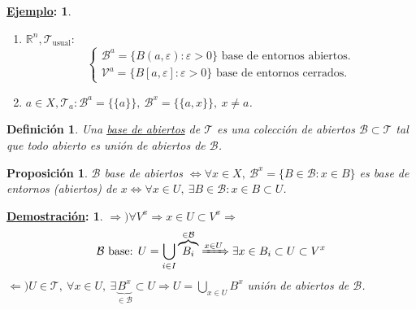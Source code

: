 \documentclass[10pt,a4paper,openright]{book}
\theoremstyle{break}
\newtheorem*{defi}{Definición}
\newtheorem*{prop}{Proposición}
\newtheorem*{demo}{\underline{Demostración}:}
\newtheorem*{ej}{\underline{Ejemplo}:}
\begin{document}
\begin{ej}
\begin{enumerate}
    \item $\mathbb{R}^n, \mathcal{T}_{\text{usual}}: $
    \[
    \begin{cases}
    \mathcal{B}^a = \{B\left( a, \varepsilon \right): \varepsilon > 0\} \text{ base de entornos abiertos.}  \\
    \mathcal{V}^a = \{B\left[ a, \varepsilon \right]: \varepsilon > 0\} \text{ base de entornos cerrados.} 
    \end{cases} 
    \]
    \item $a \in X, \mathcal{T}_a : \mathcal{B}^a = \{\{a\}\},\ \mathcal{B}^x = \{\{a, x\}\},\ x \neq a$.
\end{enumerate}
\end{ej}

\begin{defi}
Una \underline{base de abiertos} de $\mathcal{T}$ es una colección de abiertos $\mathcal{B} \subset \mathcal{T}$ tal que todo abierto es unión de abiertos de $\mathcal{B}$.
\end{defi}

\begin{prop}
$\mathcal{B}$ base de abiertos $\Leftrightarrow \forall x \in X,\ \mathcal{B}^x = \{B \in \mathcal{B} : x \in B\}$ es base de entornos (abiertos) de $x \Leftrightarrow \forall x \in U,\ \exists B \in \mathcal{B} : x \in B \subset U$.
\end{prop}
\begin{demo}
$\Rightarrow) \forall V^x \Rightarrow x \in U \subset V^x \Rightarrow$
\[
    \mathcal{B} \text{ base: } U = \bigcup_{i \in  I} \overbrace{B_i}^{\in \mathcal{B}} \xRightarrow{x \in U} \exists x \in B_i \subset U \subset V^x
\]
$\Leftarrow) U \in \mathcal{T},\ \forall x \in U,\ \exists \underbrace{B^x}_{\in \mathcal{B}} \subset U \Rightarrow U = \bigcup_{x \in U} B^x$ unión de abiertos de $\mathcal{B}$.
\end{demo}
\end{document}
